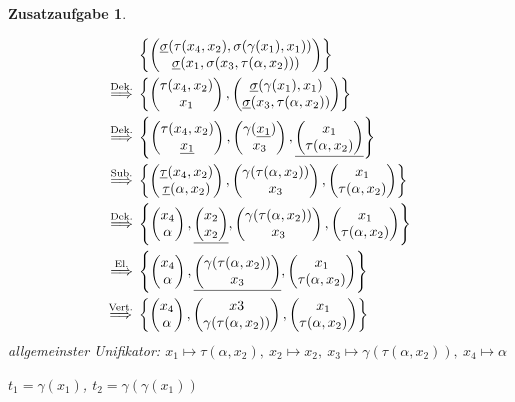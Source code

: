 \documentclass[11pt, twoside, BCOR=16mm, a4paper, DIV=15, numbers=noenddot]{scrartcl}
\theoremstyle{break}
\newtheorem{zu}{Zusatzaufgabe}
\begin{document}
\begin{zu}
  \begin{teilaufg}
\item\mbox{}\vspace{-2em}
	\begin{align*}
		& \left\{\begin{pmatrix}\underline{\sigma}(\tau( x_4, x_2 ),\sigma(\gamma( x_1 ), x_1 ))\\ \underline{\sigma}(x_1,\sigma( x_3 , \tau(\alpha, x_2 )))\end{pmatrix}\right\}
	\\
		\stackrel{\smash{\text{Dek.}}}{\Longrightarrow} {}& \left\{ \begin{pmatrix}\tau( x_4, x_2 )\\  x_1\end{pmatrix}, \begin{pmatrix}\underline{\sigma}(\gamma( x_1 ), x_1 )\\ \underline{\sigma}( x_3 , \tau(\alpha, x_2))\end{pmatrix} \right\}
	\\
		\stackrel{\smash{\text{Dek.}}}{\Longrightarrow} {}& \left\{ \begin{pmatrix}\tau( x_4, x_2 )\\  \underline{x_1}\end{pmatrix}, \begin{pmatrix}\gamma( \underline{x_1})\\ x_3 \end{pmatrix}, \underline{\begin{pmatrix}x_1\\ \tau(\alpha, x_2)\end{pmatrix} } \right\}
	\\
		\stackrel{\smash{\text{Sub.}}}{\Longrightarrow} {}& \left\{ \begin{pmatrix}\underline{\tau}( x_4, x_2 )\\ \underline{\tau}(\alpha, x_2)\end{pmatrix}, \begin{pmatrix}\gamma( \tau(\alpha, x_2))\\ x_3 \end{pmatrix}, \begin{pmatrix}x_1\\ \tau(\alpha, x_2)\end{pmatrix}\right\}
	\\
		\stackrel{\smash{\text{Dek.}}}{\Longrightarrow} {}& \left\{ \begin{pmatrix}x_4\\  \alpha\end{pmatrix}, \underline{\begin{pmatrix}x_2\\  x_2\end{pmatrix}}, \begin{pmatrix}\gamma( \tau(\alpha, x_2))\\ x_3 \end{pmatrix}, \begin{pmatrix}x_1\\ \tau(\alpha, x_2)\end{pmatrix}\right\}
	\\
		\stackrel{\smash{\text{El.}}}{\Longrightarrow} {}& \left\{ \begin{pmatrix}x_4\\  \alpha\end{pmatrix}, \underline{\begin{pmatrix}\gamma( \tau(\alpha, x_2))\\ x_3 \end{pmatrix}}, \begin{pmatrix}x_1\\ \tau(\alpha, x_2)\end{pmatrix}\right\}
	\\
		\stackrel{\smash{\text{Vert.}}}{\Longrightarrow} {}& \left\{ \begin{pmatrix}x_4\\  \alpha\end{pmatrix}, \begin{pmatrix}x3\\  \gamma( \tau(\alpha, x_2)) \end{pmatrix}, \begin{pmatrix}x_1\\ \tau(\alpha, x_2)\end{pmatrix}\right\}
	\end{align*}
	allgemeinster Unifikator: $x_1\mapsto\tau(\alpha, x_2),\ x_2\mapsto x_2,\ x_3\mapsto \gamma( \tau(\alpha, x_2)),\ x_4\mapsto \alpha$
\item
	\(t_1 = \gamma(x_1)\), \(t_2 = \gamma(\gamma(x_1))\)
\end{teilaufg}
\end{zu}
\end{document}
